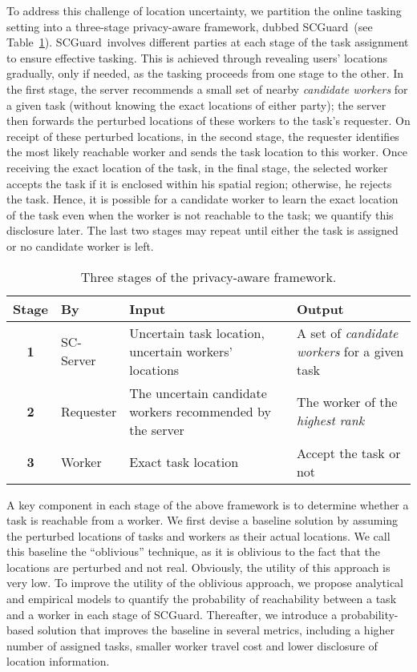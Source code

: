 \documentclass{USC-Thesis}
\newcommand{\SCG}{{SCGuard}}
\numberwithin{equation}{chapter}
\begin{document}
To address this challenge of location uncertainty, we partition the online tasking setting into a three-stage privacy-aware framework, dubbed \SCG\ (see Table~\ref{tab:stages}). \SCG\ involves different parties at each stage of the task assignment to ensure effective tasking. This is achieved through revealing users' locations gradually, only if needed, as the tasking proceeds from one stage to the other. In the first stage, the server recommends a small set of nearby \emph{candidate workers} for a given task (without knowing the exact locations of either party); the server then forwards the perturbed locations of these workers to the task's requester. On receipt of these perturbed locations, in the second stage, the requester identifies the most likely reachable worker and sends the task location to this worker. Once receiving the exact location of the task, in the final stage, the selected worker accepts the task if it is enclosed within his spatial region; otherwise, he rejects the task. Hence, it is possible for a candidate worker to learn the exact location of the task even when the worker is not reachable to the task; we quantify this disclosure later. The last two stages may repeat until either the task is assigned or no candidate worker is left.

\begin{table}[ht]
\begin{center}
\footnotesize
\begin{tabular}{ | c | l | m{12.5em} | m{10em} | } 
\hline
\textbf{Stage}					& \textbf{By} & \textbf{Input} 				& \textbf{Output} \\
\hline
\textbf{1} 	& SC-Server	&  Uncertain task location, uncertain workers' locations			&  A set of \emph{candidate workers} for a given task \\ 
\hline
\textbf{2}	& Requester & The uncertain candidate workers recommended by the server & The worker of the \emph{highest rank} \\  
\hline
\textbf{3} 	& Worker	&  Exact task location			& Accept the task or not \\ 
\hline
\end{tabular}
\caption{Three stages of the privacy-aware framework.}
\label{tab:stages}
\end{center}
\end{table}

A key component in each stage of the above framework is to determine whether a task is reachable from a worker. We first devise a baseline solution by assuming the perturbed locations of tasks and workers as their actual locations. We call this baseline the ``oblivious'' technique, as it is oblivious to the fact that the locations are perturbed and not real. Obviously, the utility of this approach is very low. To improve the utility of the oblivious approach, we propose analytical and empirical models to quantify the probability of reachability between a task and a worker in each stage of \SCG. Thereafter, we introduce a probability-based solution that improves the baseline in several metrics, including a higher number of assigned tasks, smaller worker travel cost and lower disclosure of location information.
\end{document}
